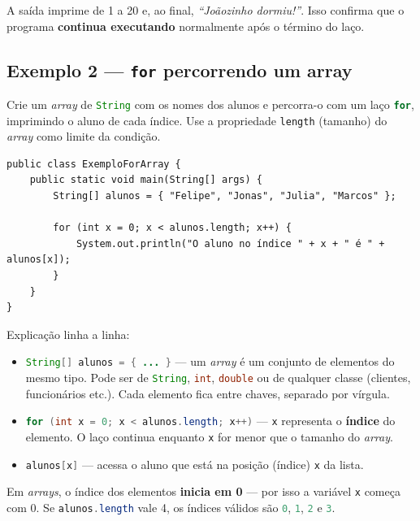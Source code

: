\documentclass[12pt,a4paper]{article}
\newcommand{\codigo}[1]{\lstinline[language=Java,basicstyle=\ttfamily\small]|#1|}
\begin{document}
\begin{observacao}
A saída imprime de 1 a 20 e, ao final, \emph{``Joãozinho dormiu!''}. Isso confirma
que o programa \textbf{continua executando} normalmente após o término do laço.
\end{observacao}

\subsection{Exemplo 2 --- \texttt{for} percorrendo um array}

\begin{enunciado}
Crie um \emph{array} de \codigo{String} com os nomes dos alunos e percorra-o com
um laço \codigo{for}, imprimindo o aluno de cada índice. Use a propriedade
\codigo{length} (tamanho) do \emph{array} como limite da condição.
\end{enunciado}

\begin{solucao}
\begin{lstlisting}[caption={ExemploForArray.java}]
public class ExemploForArray {
    public static void main(String[] args) {
        String[] alunos = { "Felipe", "Jonas", "Julia", "Marcos" };

        for (int x = 0; x < alunos.length; x++) {
            System.out.println("O aluno no índice " + x + " é " + alunos[x]);
        }
    }
}
\end{lstlisting}
\end{solucao}

Explicação linha a linha:
\begin{itemize}
  \item \codigo{String[] alunos = { ... }} --- um \emph{array} é um conjunto de
        elementos do mesmo tipo. Pode ser de \codigo{String}, \codigo{int},
        \codigo{double} ou de qualquer classe (clientes, funcionários etc.).
        Cada elemento fica entre chaves, separado por vírgula.
  \item \codigo{for (int x = 0; x < alunos.length; x++)} --- \codigo{x} representa
        o \textbf{índice} do elemento. O laço continua enquanto \codigo{x} for
        menor que o tamanho do \emph{array}.
  \item \codigo{alunos[x]} --- acessa o aluno que está na posição (índice)
        \codigo{x} da lista.
\end{itemize}

\begin{observacao}
Em \emph{arrays}, o índice dos elementos \textbf{inicia em 0} --- por isso a
variável \codigo{x} começa com 0. Se \codigo{alunos.length} vale 4, os índices
válidos são \codigo{0}, \codigo{1}, \codigo{2} e \codigo{3}.
\end{observacao}
\end{document}
